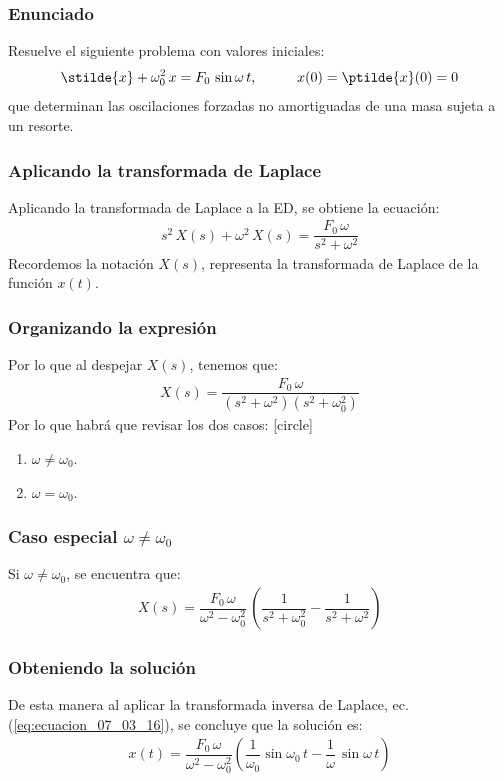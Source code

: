 \begin{frame}
\frametitle{Enunciado}
Resuelve el siguiente problema con valores iniciales:
\begin{align*}
\stilde{x} + \omega_{0}^{2} \, x = F_{0} \, \sin \omega \, t, \hspace{1cm} x(0) = \ptilde{x} (0) = 0
\end{align*}
que determinan las oscilaciones forzadas no amortiguadas de una masa sujeta a un resorte.
\end{frame}
\begin{frame}
\frametitle{Aplicando la transformada de Laplace}
Aplicando la transformada de Laplace a la ED, se obtiene la ecuación:
\pause
\begin{align*}
s^{2} \, X(s) + \omega^{2} \, X(s) = \dfrac{F_{0} \, \omega}{s^{2} + \omega^{2}}
\end{align*}
\pause
Recordemos la notación $X(s)$, representa la transformada de Laplace de la función $x(t)$.
\end{frame}
\begin{frame}
\frametitle{Organizando la expresión}
Por lo que al despejar $X(s)$, tenemos que:
\pause
\begin{align*}
X(s) = \dfrac{F_{0} \, \omega}{(s^{2} + \omega^{2})(s^{2} + \omega_{0}^{2})}
\end{align*}
\pause
Por lo que habrá que revisar los dos casos:
[circle]
\begin{enumerate}[<+->]
\item $\omega \neq \omega_{0}$.
\item $\omega = \omega_{0}$.
\end{enumerate}
\end{frame}
\begin{frame}
\frametitle{Caso especial $\omega \neq \omega_{0}$}
Si $\omega \neq \omega_{0}$, se encuentra que:
\begin{align*}
X(s) = \dfrac{F_{0} \, \omega}{\omega^{2} - \omega_{0}^{2}} \, \left( \dfrac{1}{s^{2}+ \omega_{0}^{2}} - \dfrac{1}{s^{2} + \omega^{2}} \right)
\end{align*}
\end{frame}
\begin{frame}
\frametitle{Obteniendo la solución}
De esta manera al aplicar la transformada inversa de Laplace, ec. (\ref{eq:ecuacion_07_03_16}), se concluye que la solución es:
\pause
\begin{align*}
x(t) = \dfrac{F_{0} \, \omega}{\omega^{2} - \omega_{0}^{2}} \left( \dfrac{1}{\omega_{0}} \sin \omega_{0} \, t - \dfrac{1}{\omega} \, \sin \omega \, t \right)
\end{align*}
\end{frame}
